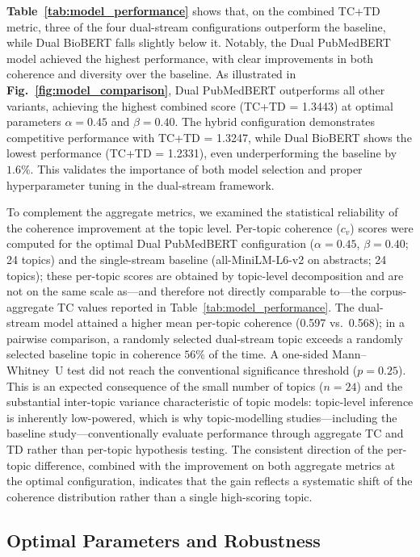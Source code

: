 \documentclass[authorproof,JACIII,researchpaper]{fujipressarticle}
\begin{document}
{\color{red}\textbf{Table~\ref{tab:model_performance}} shows that, on the combined TC+TD metric, three of the four dual-stream configurations outperform the baseline, while Dual BioBERT falls slightly below it.} {\color{red}Notably, the Dual PubMedBERT model achieved the highest performance, with clear improvements in both coherence and diversity over the baseline.} {\color{red}As illustrated in \textbf{Fig.~\ref{fig:model_comparison}}, Dual PubMedBERT outperforms all other variants, achieving the highest combined score (TC+TD = 1.3443) at optimal parameters $\alpha=0.45$ and $\beta=0.40$.} The hybrid configuration demonstrates competitive performance with TC+TD = 1.3247, while Dual BioBERT shows the lowest performance (TC+TD = 1.2331), even underperforming the baseline by $1.6\%$. This validates the importance of both model selection and proper hyperparameter tuning in the dual-stream framework.

{\color{red}%
To complement the aggregate metrics, we examined the statistical reliability of the coherence improvement at the topic level. Per-topic coherence ($c_v$) scores were computed for the optimal Dual PubMedBERT configuration ($\alpha=0.45$, $\beta=0.40$; 24 topics) and the single-stream baseline (all-MiniLM-L6-v2 on abstracts; 24 topics); these per-topic scores are obtained by topic-level decomposition and are not on the same scale as---and therefore not directly comparable to---the corpus-aggregate TC values reported in Table~\ref{tab:model_performance}. The dual-stream model attained a higher mean per-topic coherence (0.597 vs.\ 0.568); in a pairwise comparison, a randomly selected dual-stream topic exceeds a randomly selected baseline topic in coherence $56\%$ of the time. A one-sided Mann--Whitney~U test did not reach the conventional significance threshold ($p=0.25$). This is an expected consequence of the small number of topics ($n=24$) and the substantial inter-topic variance characteristic of topic models: topic-level inference is inherently low-powered, which is why topic-modelling studies---including the baseline study---conventionally evaluate performance through aggregate TC and TD rather than per-topic hypothesis testing. The consistent direction of the per-topic difference, combined with the improvement on both aggregate metrics at the optimal configuration, indicates that the gain reflects a systematic shift of the coherence distribution rather than a single high-scoring topic.
}%

{\color{red}%
\subsection{Optimal Parameters and Robustness}
}%
\end{document}
